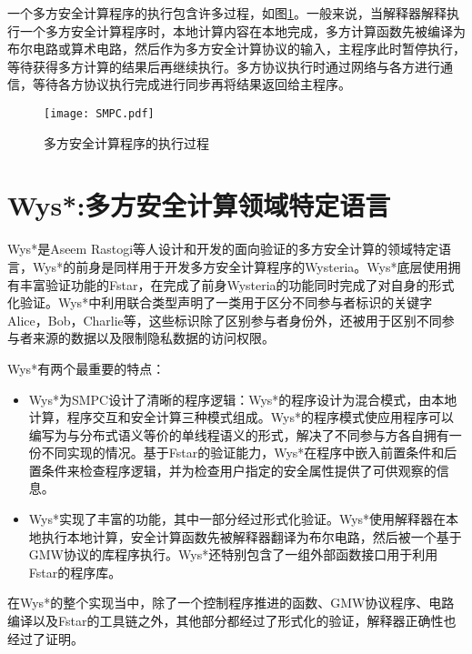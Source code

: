 一个多方安全计算程序的执行包含许多过程，如图\ref{fig:smpc}。一般来说，当解释器解释执行一个多方安全计算程序时，本地计算内容在本地完成，多方计算函数先被编译为布尔电路或算术电路，然后作为多方安全计算协议的输入，主程序此时暂停执行，等待获得多方计算的结果后再继续执行。多方协议执行时通过网络与各方进行通信，等待各方协议执行完成进行同步再将结果返回给主程序。
\begin{figure}[!htbp]
    \centering
    \texttt{[image: SMPC.pdf]}
    \caption{多方安全计算程序的执行过程}
    \label{fig:smpc}
\end{figure}

\section{Wys*:多方安全计算领域特定语言}
Wys*是Aseem Rastogi等人设计和开发的面向验证的多方安全计算的领域特定语言，Wys*的前身是同样用于开发多方安全计算程序的Wysteria\citep{rastogi2014wysteria}。Wys*底层使用拥有丰富验证功能的Fstar，在完成了前身Wysteria的功能同时完成了对自身的形式化验证。Wys*中利用联合类型声明了一类用于区分不同参与者标识的关键字Alice，Bob，Charlie等，这些标识除了区别参与者身份外，还被用于区别不同参与者来源的数据以及限制隐私数据的访问权限。 

Wys*有两个最重要的特点\citep{rastogi2019textsc}：
\begin{itemize}
	\item Wys*为SMPC设计了清晰的程序逻辑：Wys*的程序设计为混合模式，由本地计算，程序交互和安全计算三种模式组成。Wys*的程序模式使应用程序可以编写为与分布式语义等价的单线程语义的形式，解决了不同参与方各自拥有一份不同实现的情况。基于Fstar的验证能力，Wys*在程序中嵌入前置条件和后置条件来检查程序逻辑，并为检查用户指定的安全属性提供了可供观察的信息。
	\item Wys*实现了丰富的功能，其中一部分经过形式化验证。Wys*使用解释器在本地执行本地计算，安全计算函数先被解释器翻译为布尔电路，然后被一个基于GMW协议的库程序执行。Wys*还特别包含了一组外部函数接口用于利用Fstar的程序库。
\end{itemize}
在Wys*的整个实现当中，除了一个控制程序推进的函数、GMW协议程序、电路编译以及Fstar的工具链之外，其他部分都经过了形式化的验证，解释器正确性也经过了证明。 

